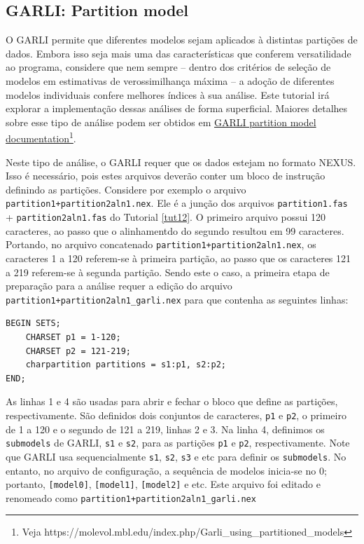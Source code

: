 \begin{refsection}
\subsection{GARLI: Partition model}\label{tut13:static_garli_partition}

O GARLI permite que diferentes modelos sejam aplicados à distintas partições de dados. Embora isso seja mais uma das características que conferem versatilidade ao programa, considere que nem sempre -- dentro dos critérios de seleção de modelos em estimativas de verossimilhança máxima -- a adoção de diferentes modelos individuais confere melhores índices à sua análise. Este tutorial irá explorar a implementação dessas análises de forma superficial. Maiores detalhes sobre esse tipo de análise podem ser obtidos em \href{https://molevol.mbl.edu/index.php/Garli_using_partitioned_models}{GARLI partition model documentation}\footnote{ Veja https://molevol.mbl.edu/index.php/Garli\_using\_partitioned\_models}.

Neste tipo de análise, o GARLI requer que os dados estejam no formato NEXUS. Isso é necessário, pois estes arquivos deverão conter um bloco de instrução definindo as partições. Considere por exemplo o arquivo \texttt{partition1+partition2aln1.nex}. Ele é a junção dos arquivos \texttt{partition1.fas} + \texttt{partition2aln1.fas} do Tutorial \ref{tut12}. O primeiro arquivo possui 120 caracteres, ao passo que o alinhamentdo do segundo resultou em 99 caracteres. Portando, no arquivo concatenado \texttt{partition1+partition2aln1.nex}, os caracteres 1 a 120 referem-se à primeira partição, ao passo que os caracteres 121 a 219 referem-se à segunda partição. Sendo este o caso, a primeira etapa de preparação para a análise requer a edição do arquivo \texttt{partition1+partition2aln1\_garli.nex} para que contenha as seguintes linhas:


\begin{lstlisting}[caption={\textt{partition1+partition2aln1\_garli.nex}}label=tut3:ls1]
BEGIN SETS;
	CHARSET p1 = 1-120;
	CHARSET p2 = 121-219;
	charpartition partitions = s1:p1, s2:p2;
END;
\end{lstlisting}

As linhas 1 e 4 são usadas para abrir e fechar o bloco que define as partições, respectivamente. São definidos dois conjuntos de caracteres, \texttt{p1} e \texttt{p2}, o primeiro de 1 a 120 e o segundo de 121 a 219, linhas 2 e 3. Na linha 4, definimos os \texttt{submodels} de GARLI, \texttt{s1} e \texttt{s2}, para as partições \texttt{p1} e \texttt{p2}, respectivamente. Note que GARLI usa sequencialmente \texttt{s1}, \texttt{s2}, \texttt{s3} e etc para definir os \texttt{submodels}. No entanto, no arquivo de configuração, a sequência de modelos inicia-se no 0; portanto, \texttt{[model0]}, \texttt{[model1]}, \texttt{[model2]} e etc. Este arquivo foi editado e renomeado como \texttt{partition1+partition2aln1\_garli.nex}


\end{refsection}

